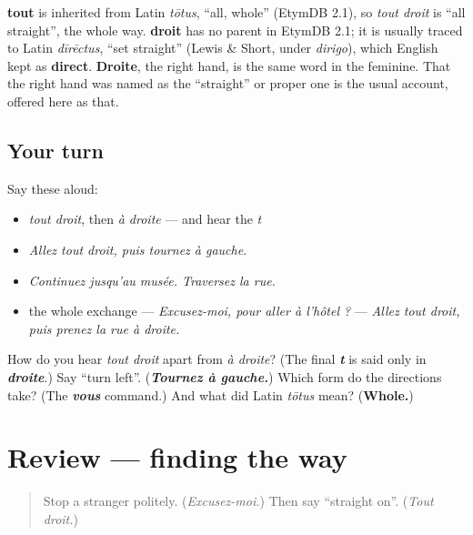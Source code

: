 \begin{cousinweb}
\textbf{tout} is inherited from Latin \emph{tōtus}, \textquotedblleft{}all, whole\textquotedblright{} (EtymDB 2.1), so \emph{tout droit} is \textquotedblleft{}all straight\textquotedblright{}, the whole way. \textbf{droit} has no parent in EtymDB 2.1; it is usually traced to Latin \emph{dīrēctus}, \textquotedblleft{}set straight\textquotedblright{} (Lewis \& Short, under \emph{dirigo}), which English kept as \textbf{direct}. \textbf{Droite}, the right hand, is the same word in the feminine. That the right hand was named as the \textquotedblleft{}straight\textquotedblright{} or proper one is the usual account, offered here as that.
\end{cousinweb}

\subsection*{Your turn}
Say these aloud:

\begin{itemize}
\raggedright
  \item \emph{tout droit}, then \emph{à droite} — and hear the \emph{t}
  \item \emph{Allez tout droit, puis tournez à gauche.}
  \item \emph{Continuez jusqu'au musée. Traversez la rue.}
  \item the whole exchange — \emph{Excusez-moi, pour aller à l'hôtel ?} — \emph{Allez tout droit, puis prenez la rue à droite.}
\end{itemize}

\begin{tcolorbox}[breakable,colback=teal!4,colframe=teal!35!black,title={Before you move on}]
How do you hear \emph{tout droit} apart from \emph{à droite}? (The final \emph{\textbf{t}} is said only in \emph{\textbf{droite}}.) Say \textquotedblleft{}turn left\textquotedblright{}. (\emph{\textbf{Tournez à gauche.}}) Which form do the directions take? (The \emph{\textbf{vous}} command.) And what did Latin \emph{tōtus} mean? (\textbf{Whole.})
\end{tcolorbox}
\section[(review)]{Review — finding the way}

\label{lesson:FR-C262-revision-chemin}



\begin{quote}
Stop a stranger politely. (\emph{Excusez-moi.}) Then say \textquotedblleft{}straight on\textquotedblright{}. (\emph{Tout droit.})
\end{quote}

